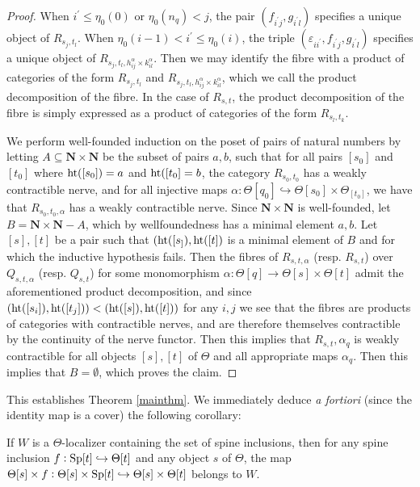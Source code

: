 \begin{proof}
When \(i^\prime\leq \eta_0(0)\) or \(\eta_0(n_q)<j\), the pair \((f_{i^\prime j},g_{i^\prime l})\) specifies 
a unique object of \(R_{s_j,t_l}\).  When \(\eta_0(i-1)< i^\prime \leq \eta_0(i)\), the triple 
\((\varepsilon_{ii^\prime}, f_{i^\prime j}, g_{i^\prime l})\) specifies a unique object of 
\(R_{s_j,t_l,h^\alpha_{ij}\times k^\alpha_{il}}\).  Then we may identify the fibre with 
a product of categories of the form \(R_{s_j,t_l}\) and 
\(R_{s_j,t_l,h^\alpha_{ij}\times k^\alpha_{il}}\), which we call the product decomposition of the fibre.  
In the case of \(R_{s,t}\), the product decomposition of the fibre is simply expressed as a product of categories 
of the form \(R_{s_l,t_k}\).  

We perform well-founded induction on the poset of pairs of natural numbers by letting 
\(A\subseteq \mathbf{N}\times \mathbf{N}\) be the subset of pairs \(a,b\), such that 
for all pairs \([s_0]\) and \([t_0]\) where \(\operatorname{ht}([s_0])=a\) and \(\operatorname{ht}([t_0]=b\), 
the category \(R_{s_0,t_0}\) has a weakly contractible nerve, and for all injective 
maps \(\alpha:\Theta[q_0]\hookrightarrow \Theta[s_0]\times \Theta_[t_0]\), we have 
that \(R_{s_0,t_0,\alpha}\) has a weakly contractible nerve.  Since \(\mathbf{N}\times \mathbf{N}\) 
is well-founded, let \(B=\mathbf{N}\times\mathbf{N} - A\), which by wellfoundedness 
has a minimal element \(a,b\).   Let \([s],[t]\) be a pair such that 
\((\operatorname{ht}([s_]),\operatorname{ht}([t])\) is a minimal element of \(B\) and for which 
the inductive hypothesis fails.  Then the fibres of \(R_{s,t,\alpha}\) (resp. \(R_{s,t}\)) over 
\(Q_{s,t,\alpha}\) (resp. \(Q_{s,t}\)) for some monomorphism \(\alpha:\Theta[q]\to \Theta[s]\times \Theta[t]\) 
admit the aforementioned product decomposition, and since 
\((\operatorname{ht}([s_i]),\operatorname{ht}([t_j]))<(\operatorname{ht}([s]),\operatorname{ht}([t]))\) for any \(i,j\) we see that the 
fibres are products of categories with contractible nerves, and are therefore themselves 
contractible by the continuity of the nerve functor.   Then this implies that \(R_{s,t},\alpha_q\) is weakly contractible for all objects \([s], [t]\) of \(\Theta\) and all appropriate maps \(\alpha_q\).  Then this implies that \(B=\emptyset\), which proves the claim.
\end{proof}

This establishes Theorem \eqref{mainthm}.  We immediately deduce \emph{a fortiori} (since the identity map is a cover) the following corollary:

\begin{cor} If \(W\) is a \(\Theta\)-localizer containing the set of spine inclusions, then for any spine inclusion \(f:{\operatorname{Sp}}[t]\hookrightarrow \Theta[t]\) and any object \(s\) of \(\Theta\),  the map \(\Theta[s]\times f: \Theta[s]\times {\operatorname{Sp}}[t]\hookrightarrow \Theta[s]\times \Theta[t]\) belongs to \(W\).
\end{cor}

